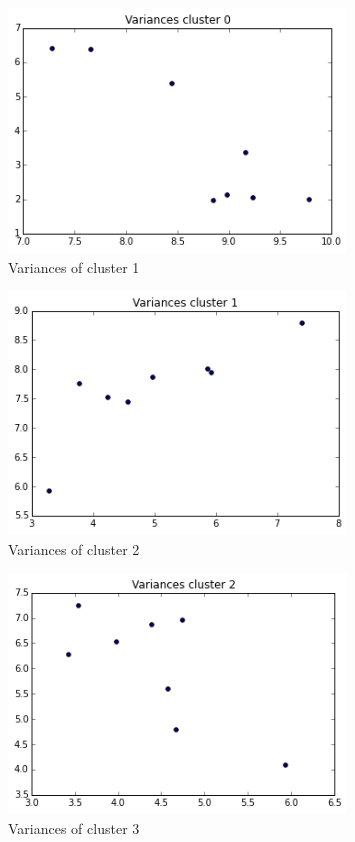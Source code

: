 \documentclass[paper=a4, fontsize=11pt]{scrartcl} %
\numberwithin{equation}{section} %
\numberwithin{figure}{section} %
\numberwithin{table}{section} %
\begin{document}
\begin{figure}[ht]
	\centering
  \includegraphics[width=0.8\textwidth]{variance_c1.png}
	\caption{Variances of cluster 1}
	\label{figv1}
\end{figure}
\begin{figure}[ht]
	\centering
  \includegraphics[width=0.8\textwidth]{variance_c2.png}
	\caption{Variances of cluster 2}
	\label{figv2}
\end{figure}
\begin{figure}[ht]
	\centering
  \includegraphics[width=0.8\textwidth]{variance_c3.png}
	\caption{Variances of cluster 3}
	\label{figv3}
\end{figure}
\end{document}
